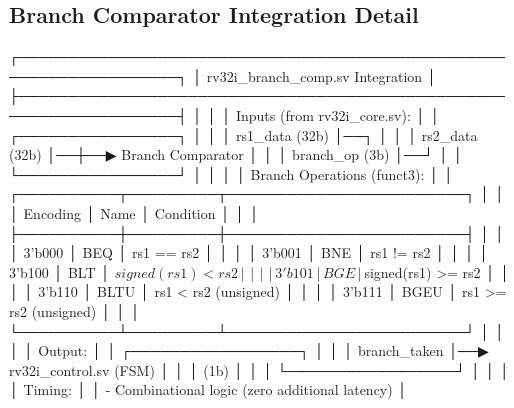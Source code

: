 \subsection{Branch Comparator Integration Detail}\label{cr:fix:cpu-dataflow-diagram:branch-comparator-integration-detail}

\begin{record}

\begin{logblock}
┌──────────────────────────────────────────────────────────────────┐
│             rv32i_branch_comp.sv Integration                     │
├──────────────────────────────────────────────────────────────────┤
│                                                                  │
│  Inputs (from rv32i_core.sv):                                    │
│  ┌────────────────┐                                              │
│  │ rs1_data (32b) │──┐                                           │
│  │ rs2_data (32b) │──┼──▶ Branch Comparator                      │
│  │ branch_op (3b) │──┘                                           │
│  └────────────────┘                                              │
│                                                                  │
│  Branch Operations (funct3):                                     │
│  ┌──────────┬─────────┬────────────────────────┐                 │
│  │ Encoding │  Name   │ Condition              │                 │
│  ├──────────┼─────────┼────────────────────────┤                 │
│  │ 3'b000   │ BEQ     │ rs1 == rs2             │                 │
│  │ 3'b001   │ BNE     │ rs1 != rs2             │                 │
│  │ 3'b100   │ BLT     │ $signed(rs1) < rs2     │                 │
│  │ 3'b101   │ BGE     │ $signed(rs1) >= rs2    │                 │
│  │ 3'b110   │ BLTU    │ rs1 < rs2 (unsigned)   │                 │
│  │ 3'b111   │ BGEU    │ rs1 >= rs2 (unsigned)  │                 │
│  └──────────┴─────────┴────────────────────────┘                 │
│                                                                  │
│  Output:                                                         │
│  ┌─────────────────┐                                             │
│  │ branch_taken    │──▶ rv32i_control.sv (FSM)                   │
│  │ (1b)            │                                             │
│  └─────────────────┘                                             │
│                                                                  │
│  Timing:                                                         │
│  - Combinational logic (zero additional latency)                 │

\end{logblock}
\end{record}
